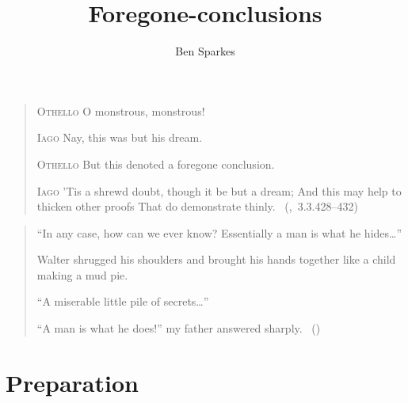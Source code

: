 \documentclass[10pt]{report}
\title{
  Foregone-conclusions
}
\author{Ben Sparkes}
\begin{document}
\nocite{Lewis:1973aa}


\maketitle

\begin{quote}
  \textsc{Othello} O monstrous, monstrous!

  \textsc{Iago}\phantom{O monstrous, monstrous! Nay,} Nay, this was but his dream.

  \textsc{Othello} But this denoted a foregone conclusion.

  \textsc{Iago} 'Tis a shrewd doubt, though it be but a dream;\newline
  And this may help to thicken other proofs\newline
  That do demonstrate thinly.\newline
  \mbox{ }\hfill\mbox{(, 3.3.428--432)}
\end{quote}

\vfill

\begin{quote}
  ``In any case, how can we ever know? Essentially a man is what he hides\dots''

  Walter shrugged his shoulders and brought his hands together like a child making a mud pie.

  ``A miserable little pile of secrets\dots''

  ``A man is what he does!'' my father answered sharply.\newline
  \mbox{ }\hfill\mbox{(\cite[20]{Malraux:1968aa})}
\end{quote}

\tableofcontents

\newpage

\setcounter{chapter}{-1}


%

% 



\part{Preparation}
\label{part:prep}
\end{document}
